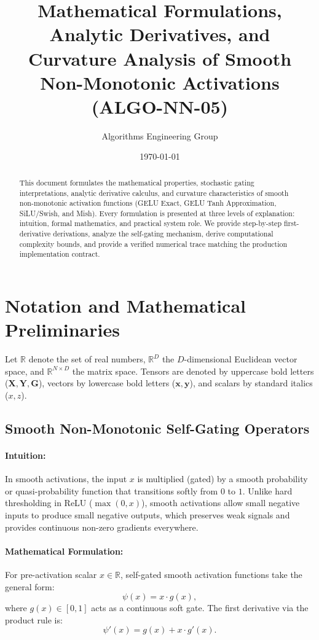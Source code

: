 \documentclass[11pt]{article}
\title{Mathematical Formulations, Analytic Derivatives, and Curvature Analysis of Smooth Non-Monotonic Activations (ALGO-NN-05)}
\author{Algorithms Engineering Group}
\date{\today}
\begin{document}
\maketitle

\begin{abstract}
This document formulates the mathematical properties, stochastic gating interpretations, analytic derivative calculus, and curvature characteristics of smooth non-monotonic activation functions (GELU Exact, GELU Tanh Approximation, SiLU/Swish, and Mish). Every formulation is presented at three levels of explanation: intuition, formal mathematics, and practical system role. We provide step-by-step first-derivative derivations, analyze the self-gating mechanism, derive computational complexity bounds, and provide a verified numerical trace matching the production implementation contract.
\end{abstract}

\section{Notation and Mathematical Preliminaries}
\label{sec:notation}

Let $\mathbb{R}$ denote the set of real numbers, $\mathbb{R}^D$ the $D$-dimensional Euclidean vector space, and $\mathbb{R}^{N \times D}$ the matrix space. Tensors are denoted by uppercase bold letters ($\mathbf{X}, \mathbf{Y}, \mathbf{G}$), vectors by lowercase bold letters ($\mathbf{x}, \mathbf{y}$), and scalars by standard italics ($x, z$).

\subsection{Smooth Non-Monotonic Self-Gating Operators}
\paragraph{Intuition:} In smooth activations, the input $x$ is multiplied (gated) by a smooth probability or quasi-probability function that transitions softly from $0$ to $1$. Unlike hard thresholding in ReLU ($\max(0, x)$), smooth activations allow small negative inputs to produce small negative outputs, which preserves weak signals and provides continuous non-zero gradients everywhere.

\paragraph{Mathematical Formulation:}
For pre-activation scalar $x \in \mathbb{R}$, self-gated smooth activation functions take the general form:
\begin{equation}
\label{eq:self_gated}
\psi(x) = x \cdot g(x),
\end{equation}
where $g(x) \in [0, 1]$ acts as a continuous soft gate. The first derivative via the product rule is:
\begin{equation}
\label{eq:derivative_general}
\psi'(x) = g(x) + x \cdot g'(x).
\end{equation}
\end{document}
